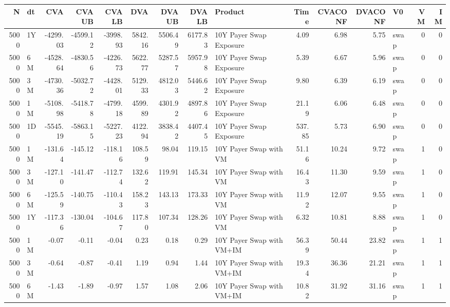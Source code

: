 \begin{tabular}{rlrrrrrrlrrrlrr}
\toprule
   N & dt &       CVA &     CVAUB &    CVALB &     DVA &   DVAUB &   DVALB &                       Product &    Time &  CVACONF &  DVACONF &   V0 &  VM &  IM \\
\midrule
5000 & 1Y &  -4299.03 &  -4599.12 & -3998.93 & 5842.16 & 5506.49 & 6177.83 &       10Y Payer Swap Exposure &    4.09 &     6.98 &     5.75 & swap &   0 &   0 \\
5000 & 6M &  -4528.64 &  -4830.56 & -4226.73 & 5622.77 & 5287.57 & 5957.98 &       10Y Payer Swap Exposure &    5.39 &     6.67 &     5.96 & swap &   0 &   0 \\
5000 & 3M &  -4730.36 &  -5032.72 & -4428.01 & 5129.33 & 4812.03 & 5446.62 &       10Y Payer Swap Exposure &    9.80 &     6.39 &     6.19 & swap &   0 &   0 \\
5000 & 1M &  -5108.98 &  -5418.78 & -4799.18 & 4599.89 & 4301.92 & 4897.86 &       10Y Payer Swap Exposure &   21.19 &     6.06 &     6.48 & swap &   0 &   0 \\
5000 & 1D &  -5545.19 &  -5863.15 & -5227.23 & 4122.94 & 3838.42 & 4407.45 &       10Y Payer Swap Exposure &  537.85 &     5.73 &     6.90 & swap &   0 &   0 \\
5000 & 1M &   -131.64 &   -145.12 &  -118.16 &  108.59 &   98.04 &  119.15 &        10Y Payer Swap with VM &   51.16 &    10.24 &     9.72 & swap &   1 &   0 \\
5000 & 3M &   -127.10 &   -141.47 &  -112.74 &  132.62 &  119.91 &  145.34 &        10Y Payer Swap with VM &   16.43 &    11.30 &     9.59 & swap &   1 &   0 \\
5000 & 6M &   -125.59 &   -140.75 &  -110.43 &  158.23 &  143.13 &  173.33 &        10Y Payer Swap with VM &   11.92 &    12.07 &     9.55 & swap &   1 &   0 \\
5000 & 1Y &   -117.36 &   -130.04 &  -104.67 &  117.80 &  107.34 &  128.26 &        10Y Payer Swap with VM &    6.32 &    10.81 &     8.88 & swap &   1 &   0 \\
5000 & 1M &     -0.07 &     -0.11 &    -0.04 &    0.23 &    0.18 &    0.29 &     10Y Payer Swap with VM+IM &   56.39 &    50.44 &    23.82 & swap &   1 &   1 \\
5000 & 3M &     -0.64 &     -0.87 &    -0.41 &    1.19 &    0.94 &    1.44 &     10Y Payer Swap with VM+IM &   19.34 &    36.36 &    21.21 & swap &   1 &   1 \\
5000 & 6M &     -1.43 &     -1.89 &    -0.97 &    1.57 &    1.08 &    2.06 &     10Y Payer Swap with VM+IM &   10.82 &    31.92 &    31.16 & swap &   1 &   1 \\

\end{tabular}
